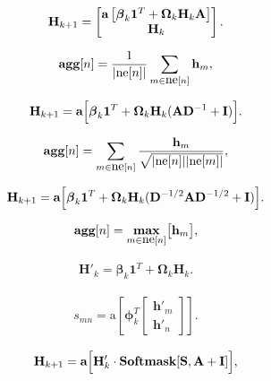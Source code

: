 \documentclass[letterpaper,twoside,openany, titlepage,oldfontcommands,titles,dvipsnames]{memoir}
\begin{document}
\begin{eqnarray}\label{eq:graph_residual}
 \mathbf{H}_{k+1} = \begin{bmatrix}\mbox{\bf a}\left[\boldsymbol\beta_{k}\mathbf{1}^{T} + \boldsymbol\Omega_{k} \mathbf{H}_{k}\mathbf{A} \right]\\\mathbf{H}_{k}\end{bmatrix}.
 \end{eqnarray}

\begin{eqnarray}\label{eq:graph_mean_agg}
 \mbox{\bf agg}[n] = \frac{1}{|\mbox{ne}[n]|}\sum_{m\in\mbox{ne}[n]}\mathbf{h}_{m},
 \end{eqnarray}

\begin{eqnarray}
 \mathbf{H}_{k+1} = \mbox{\bf a}\Bigl[\boldsymbol\beta_{k}\mathbf{1}^{T} + \boldsymbol\Omega_{k} \mathbf{H}_{k}(\mathbf{A}\mathbf{D}^{-1}+\mathbf{I}) \Bigr].
 \end{eqnarray}

\begin{eqnarray}\label{eq:graph_kipf_normalization}
 \mbox{\bf agg}[n] = \sum_{m\in\mbox{ne}[n]}\frac{\mathbf{h}_{m}}{\sqrt{|\mbox{ne}[n]||\mbox{ne}[m]|}},
 \end{eqnarray}

\begin{eqnarray}
 \mathbf{H}_{k+1} = \mbox{\bf a}\Bigl[\boldsymbol\beta_{k}\mathbf{1}^{T} + \boldsymbol\Omega_{k} \mathbf{H}_{k}(\mathbf{D}^{-1/2}\mathbf{A}\mathbf{D}^{-1/2}+\mathbf{I}) \Bigr].
 \end{eqnarray}

\begin{eqnarray}
 \mbox{\bf agg}[n] =\mathop{\rm \bf max}_{m\in\mbox{ne}[n]}\bigl[\mathbf{h}_{m}\bigr],
 \end{eqnarray}

\begin{eqnarray}
 \mathbf{H}'_{k} = \boldsymbol\beta_k\mathbf{1}^{T} + \boldsymbol\Omega_k\mathbf{H}_k.
 \end{eqnarray}

\begin{eqnarray}
  s_{mn} = \mbox{a}\left[\boldsymbol\phi_k^{T}\begin{bmatrix}\mathbf{h}'_{m}\\\mathbf{h}'_{n}\end{bmatrix}\right].
 \end{eqnarray}

\begin{eqnarray}
  \mathbf{H}_{k+1} = \mbox{\bf a}\Bigl[\mathbf{H}'_{k}\cdot\mbox{\bf Softmask}[\mathbf{S}, \mathbf{A}+\mathbf{I}] \Bigr],
 \end{eqnarray}
\end{document}
